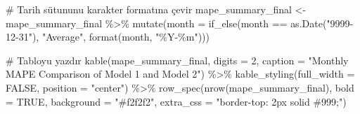 \documentclass[
]{article}
\newenvironment{Shaded}{\begin{snugshade}}{\end{snugshade}}
\newcommand{\AttributeTok}[1]{\textcolor[rgb]{0.40,0.45,0.13}{#1}}
\newcommand{\CommentTok}[1]{\textcolor[rgb]{0.37,0.37,0.37}{#1}}
\newcommand{\ConstantTok}[1]{\textcolor[rgb]{0.56,0.35,0.01}{#1}}
\newcommand{\DecValTok}[1]{\textcolor[rgb]{0.68,0.00,0.00}{#1}}
\newcommand{\FunctionTok}[1]{\textcolor[rgb]{0.28,0.35,0.67}{#1}}
\newcommand{\NormalTok}[1]{\textcolor[rgb]{0.00,0.23,0.31}{#1}}
\newcommand{\OtherTok}[1]{\textcolor[rgb]{0.00,0.23,0.31}{#1}}
\newcommand{\SpecialCharTok}[1]{\textcolor[rgb]{0.37,0.37,0.37}{#1}}
\newcommand{\StringTok}[1]{\textcolor[rgb]{0.13,0.47,0.30}{#1}}
\begin{document}
\begin{Shaded}
\begin{Highlighting}[]
\CommentTok{\# Tarih sütununu karakter formatına çevir}
\NormalTok{mape\_summary\_final }\OtherTok{\textless{}{-}}\NormalTok{ mape\_summary\_final }\SpecialCharTok{\%\textgreater{}\%}
  \FunctionTok{mutate}\NormalTok{(}\AttributeTok{month =} \FunctionTok{if\_else}\NormalTok{(month }\SpecialCharTok{==} \FunctionTok{as.Date}\NormalTok{(}\StringTok{"9999{-}12{-}31"}\NormalTok{), }\StringTok{"Average"}\NormalTok{, }\FunctionTok{format}\NormalTok{(month, }\StringTok{"\%Y{-}\%m"}\NormalTok{)))}

\CommentTok{\# Tabloyu yazdır}
\FunctionTok{kable}\NormalTok{(mape\_summary\_final, }\AttributeTok{digits =} \DecValTok{2}\NormalTok{, }\AttributeTok{caption =} \StringTok{"Monthly MAPE Comparison of Model 1 and Model 2"}\NormalTok{) }\SpecialCharTok{\%\textgreater{}\%}
  \FunctionTok{kable\_styling}\NormalTok{(}\AttributeTok{full\_width =} \ConstantTok{FALSE}\NormalTok{, }\AttributeTok{position =} \StringTok{"center"}\NormalTok{) }\SpecialCharTok{\%\textgreater{}\%}
  \FunctionTok{row\_spec}\NormalTok{(}\FunctionTok{nrow}\NormalTok{(mape\_summary\_final), }\AttributeTok{bold =} \ConstantTok{TRUE}\NormalTok{, }\AttributeTok{background =} \StringTok{"\#f2f2f2"}\NormalTok{, }
           \AttributeTok{extra\_css =} \StringTok{"border{-}top: 2px solid \#999;"}\NormalTok{)}
\end{Highlighting}
\end{Shaded}
\end{document}
